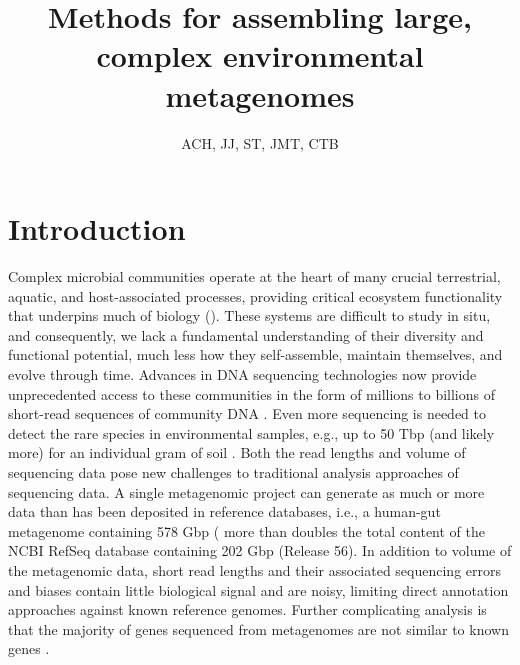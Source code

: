\documentclass[11pt]{article} %
\begin{document}
\title{Methods for assembling large, complex environmental metagenomes}
\author{ACH, JJ, ST, JMT, CTB} 
\maketitle

\section{Introduction}  
Complex microbial communities operate at the heart of many crucial
terrestrial, aquatic, and host-associated processes, providing
critical ecosystem functionality that underpins much of biology
(\cite{Arumugam:2011p735,Hess:2011p686,Iverson:2012p1281,
  Mackelprang:2011p1087,Qin:2010p189,Tringe:2005p174,Venter:2004p170}).
These systems are difficult to study in situ, and consequently, we
lack a fundamental understanding of their diversity and functional
potential, much less how they self-assemble, maintain themselves, and
evolve through time.  Advances in DNA sequencing technologies now
provide unprecedented access to these communities in the form of
millions to billions of short-read sequences of community DNA
\cite{Hess:2011p686,Mackelprang:2011p1087,Qin:2010p189}.  Even more
sequencing is needed to detect the rare species in environmental
samples, e.g., up to 50 Tbp (and likely more) for an individual gram
of soil \cite{Gans:2005p1365}.  Both the read lengths and volume of
sequencing data pose new challenges to traditional analysis approaches
of sequencing data.  A single metagenomic project can generate as much
or more data than has been deposited in reference databases, i.e., a
human-gut metagenome containing 578 Gbp (\cite{Qin:2010p189} more than
doubles the total content of the NCBI RefSeq database containing 202
Gbp (Release 56).  In addition to volume of the metagenomic data,
short read lengths and their associated sequencing errors and biases
contain little biological signal and are noisy, limiting direct
annotation approaches against known reference genomes.  Further
complicating analysis is that the majority of genes sequenced from
metagenomes are not similar to known genes
\cite{Arumugam:2011p735,Qin:2010p189}.
\end{document}
